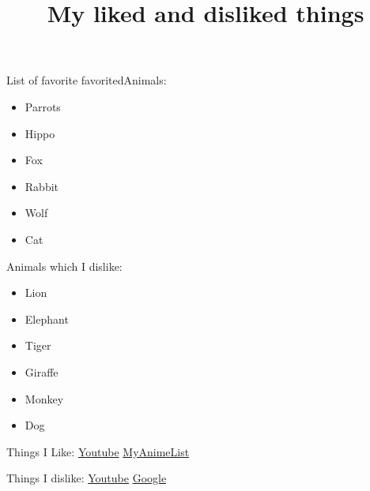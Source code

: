 \documentclass{article}
\begin{document}
\title{My liked and disliked things }
\maketitle
\par
List of favorite favoritedAnimals:
\begin{itemize}
\item Parrots
\item Hippo
\item Fox
\item Rabbit
\item Wolf
\item Cat
\end{itemize}
\par
\par
Animals which I dislike:
\begin{itemize}
\item Lion
\item Elephant
\item Tiger
\item Giraffe
\item Monkey
\item Dog
\end{itemize}
\par
\par
Things I Like:
\href{https://www.youtube.com/}{Youtube}
\href{https://myanimelist.net/}{MyAnimeList}
\par
Things I dislike:
\href{https://youtube.com}{Youtube}
\href{https://google.com}{Google}
\end{document}
